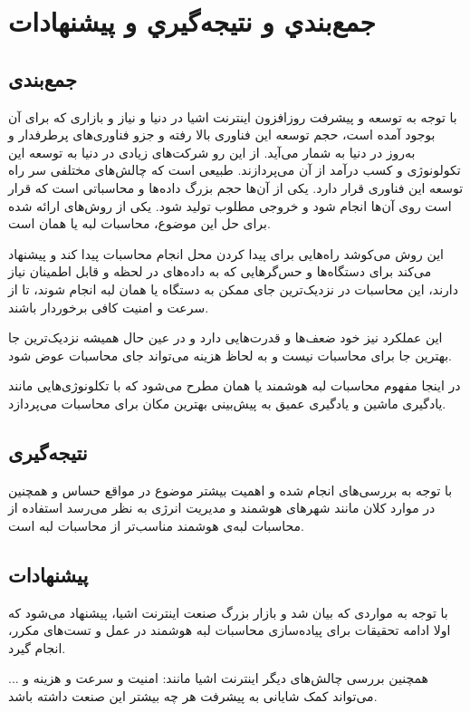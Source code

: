 \chapter{جمع‌بندي و نتيجه‌گيري و پیشنهادات}
\section{جمع‌بندی}

با توجه به توسعه و پیشرفت روزافزون اینترنت اشیا در دنیا و نیاز و بازاری که برای آن بوجود آمده است، حجم توسعه این فناوری بالا رفته و جزو فناوری‌های پرطرفدار و به‌روز در دنیا به شمار می‌آید.
از این رو شرکت‌های زیادی در دنیا به توسعه این تکولونوژی و کسب درآمد از آن می‌پردازند.
طبیعی است که چالش‌های مختلفی سر راه توسعه این فناوری قرار دارد.
یکی از آن‌ها حجم بزرگ داده‌ها و محاسباتی است که قرار است روی آن‌ها انجام شود و خروجی مطلوب تولید شود.
یکی از روش‌های ارائه شده برای حل این موضوع، محاسبات لبه یا همان   است.

این روش می‌کوشد راه‌هایی برای پیدا کردن محل انجام محاسبات پیدا کند و پیشنهاد می‌کند برای دستگاه‌ها و حس‌گر‌هایی که به داده‌های در لحظه و قابل اطمینان نیاز دارند، این محاسبات در نزدیک‌ترین جای ممکن به دستگاه یا همان لبه انجام شوند، تا از سرعت و امنیت کافی برخوردار باشند.

این عملکرد نیز خود ضعف‌ها و قدرت‌هایی دارد و در عین حال همیشه نزدیک‌ترین جا بهترین جا برای محاسبات نیست و به لحاظ هزینه می‌تواند جای محاسبات عوض شود.

در اینجا مفهوم محاسبات لبه هوشمند یا همان  مطرح می‌شود که با تکلونوژی‌هایی مانند یادگیری ماشین و یادگیری عمیق به پیش‌بینی بهترین مکان برای محاسبات می‌پردازد.

\section{نتیجه‌گیری}
با توجه به بررسی‌های انجام شده و اهمیت بیشتر موضوع در مواقع حساس و همچنین در موارد کلان مانند شهرهای هوشمند و مدیریت انرژی به نظر می‌رسد استفاده از محاسبات لبه‌ی هوشمند مناسب‌تر از محاسبات لبه است.
\section{پیشنهادات}
با توجه به مواردی که بیان شد و بازار بزرگ صنعت اینترنت اشیا، پیشنهاد می‌شود که اولا ادامه تحقیقات برای پیاده‌سازی محاسبات لبه هوشمند در عمل و تست‌های مکرر، انجام گیرد.

همچنین بررسی چالش‌های دیگر اینترنت اشیا مانند: امنیت و سرعت و هزینه و ... می‌تواند کمک شایانی به پیشرفت هر چه بیشتر این صنعت داشته باشد.